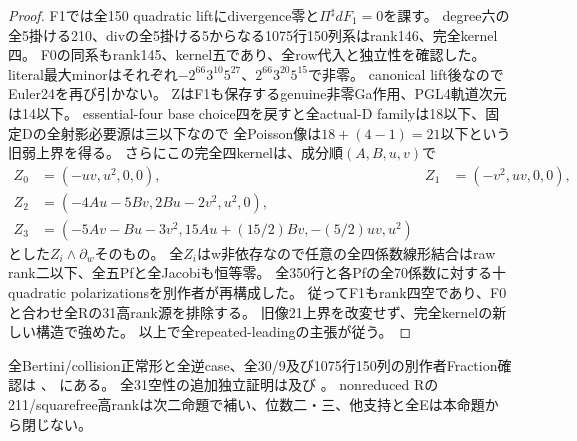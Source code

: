 \documentclass[a4paper,11pt]{ltjsarticle}
\theoremstyle{definition}
\begin{document}
\begin{proof}
F1では全150 quadratic liftにdivergence零と$\Pi^\sharp dF_1=0$を課す。
degree六の全5掛ける210、divの全5掛ける5からなる1075行150列系はrank146、完全kernel四。
F0の同系もrank145、kernel五であり、全row代入と独立性を確認した。
literal最大minorはそれぞれ$-2^{66}3^{10}5^{27}$、$2^{66}3^{20}5^{15}$で非零。
canonical lift後なのでEuler24を再び引かない。
ZはF1も保存するgenuine非零Ga作用、PGL4軌道次元は14以下。
essential-four base choice四を戻すと全actual-D familyは18以下、固定Dの全射影必要源は三以下なので
全Poisson像は$18+(4-1)=21$以下という旧弱上界を得る。
さらにこの完全四kernelは、成分順$(A,B,u,v)$で
\[
\begin{aligned}
 Z_0&=(-uv,u^2,0,0),&Z_1&=(-v^2,uv,0,0),\\
 Z_2&=(-4Au-5Bv,2Bu-2v^2,u^2,0),\\
 Z_3&=(-5Av-Bu-3v^2,15Au+(15/2)Bv,-(5/2)uv,u^2)
\end{aligned}
\]
とした$Z_i\wedge\partial_w$そのもの。
全$Z_i$はw非依存なので任意の全四係数線形結合はraw rank二以下、全五Pfと全Jacobiも恒等零。
全350行と各Pfの全70係数に対する十quadratic polarizationsを別作者が再構成した。
従ってF1もrank四空であり、F0と合わせ全Rの31高rank源を排除する。
旧像21上界を改変せず、完全kernelの新しい構造で強めた。
以上で全repeated-leadingの主張が従う。
\end{proof}
全Bertini/collision正常形と全逆case、全30/9及び1075行150列の別作者Fraction確認は
、
にある。
全31空性の追加独立証明は及び
。
nonreduced Rの211/squarefree高rankは次二命題で補い、位数二・三、他支持と全Eは本命題から閉じない。
\end{document}
